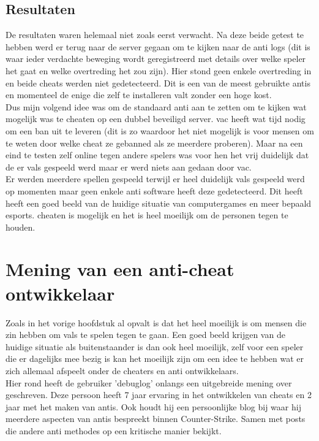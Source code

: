 \documentclass[pdftex,a4paper,12pt,twoside]{report}
\begin{document}
\section{Resultaten}
\label{sec:resultaten}
De resultaten waren helemaal niet zoals eerst verwacht. Na deze beide getest te hebben werd er terug naar de server gegaan om te kijken naar de \gls{anti} logs (dit is waar ieder verdachte beweging wordt geregistreerd met details over welke speler het gaat en welke overtreding het zou zijn). Hier stond geen enkele overtreding in en beide \gls{cheat}s werden niet gedetecteerd. Dit is een van de meest gebruikte \gls{anti}s en momenteel de enige die zelf te installeren valt zonder een hoge kost. 
\\

Dus mijn volgend idee was om de standaard \gls{anti} aan te zetten om te kijken wat mogelijk was te \gls{cheat}en op een dubbel beveiligd server. \gls{vac} heeft wat tijd nodig om een ban uit te leveren (dit is zo waardoor het niet mogelijk is voor mensen om te weten door welke \gls{cheat} ze gebanned als ze meerdere proberen). Maar na een eind te testen zelf online tegen andere spelers was voor hen het vrij duidelijk dat de er vals gespeeld werd maar er werd niets aan gedaan door \gls{vac}.
\\

Er werden meerdere spellen gespeeld terwijl er heel duidelijk vals gespeeld werd op momenten maar geen enkele \gls{anti} software heeft deze gedetecteerd. Dit heeft heeft een goed beeld van de huidige situatie van computergames en meer bepaald \gls{esports}. \Gls{cheat}en is mogelijk en het is heel moeilijk om de personen tegen te houden.

\chapter{Mening van een anti-cheat ontwikkelaar}
\label{ch:mening}
Zoals in het vorige hoofdstuk al opvalt is dat het heel moeilijk is om mensen die zin hebben om vals te spelen tegen te gaan. Een goed beeld krijgen van de huidige situatie als buitenstaander is dan ook heel moeilijk, zelf voor een speler die er dagelijks mee bezig is kan het moeilijk zijn om een idee te hebben wat er zich allemaal afspeelt onder de \gls{cheat}ers en \gls{anti} ontwikkelaars. 
\\

Hier rond heeft de gebruiker 'debuglog' onlangs een uitgebreide mening over geschreven. Deze persoon heeft 7 jaar ervaring in het ontwikkelen van \gls{cheat}s en 2 jaar met het maken van \gls{anti}s. Ook houdt hij een persoonlijke blog bij waar hij meerdere aspecten van \gls{anti}s bespreekt binnen Counter-Strike. Samen met posts die andere \gls{anti} methodes op een kritische manier bekijkt.\citep{debuglogblog}
\\
\end{document}

